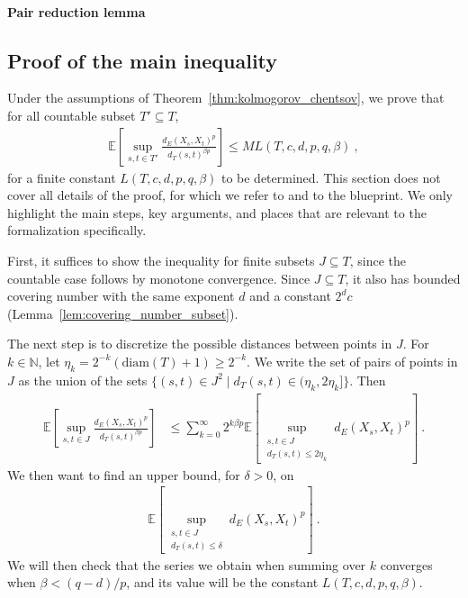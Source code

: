 \documentclass[lean]{Draft}
\begin{document}
\paragraph{Pair reduction lemma}

\subsection{Proof of the main inequality}

Under the assumptions of Theorem~\ref{thm:kolmogorov_chentsov}, we prove that for all countable subset $T' \subseteq T$,
\begin{align*}
  \mathbb{E}\left[ \sup_{s, t \in T'} \frac{d_E(X_s, X_t)^p}{d_T(s, t)^{\beta p}} \right]
  \le M L(T, c, d, p, q, \beta)
  \: ,
\end{align*}
for a finite constant $L(T, c, d, p, q, \beta)$ to be determined.
This section does not cover all details of the proof, for which we refer to \cite{kratschmer2023kolmogorov} and to the blueprint. We only highlight the main steps, key arguments, and places that are relevant to the formalization specifically.

First, it suffices to show the inequality for finite subsets $J \subseteq T$, since the countable case follows by monotone convergence.
Since $J \subseteq T$, it also has bounded covering number with the same exponent $d$ and a constant $2^d c$ (Lemma~\ref{lem:covering_number_subset}).

The next step is to discretize the possible distances between points in $J$.
For $k \in \mathbb{N}$, let $\eta_k = 2^{-k}(\mathrm{diam}(T) + 1) \ge 2^{-k}$.
We write the set of pairs of points in $J$ as the union of the sets $\{(s, t) \in J^2 \mid d_T(s, t) \in (\eta_k, 2\eta_k]\}$.
Then
\begin{align*}
  \mathbb{E}\left[ \sup_{s, t \in J} \frac{d_E(X_s, X_t)^p}{d_T(s, t)^{\beta p}} \right]
  &\le \sum_{k=0}^\infty 2^{k \beta p} \mathbb{E}\left[ \sup_{\substack{s, t \in J \\ d_T(s, t) \le 2\eta_k}} d_E(X_s, X_t)^p \right]
  \: .
\end{align*}
We then want to find an upper bound, for $\delta > 0$, on
\begin{align*}
  \mathbb{E}\left[ \sup_{\substack{s, t \in J \\ d_T(s, t) \le \delta}} d_E(X_s, X_t)^p \right]
  \: .
\end{align*}
We will then check that the series we obtain when summing over $k$ converges when $\beta < (q - d)/p$, and its value will be the constant $L(T, c, d, p, q, \beta)$.
\end{document}
